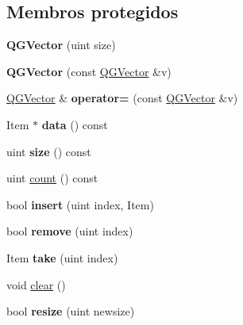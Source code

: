 \subsection*{Membros protegidos}
\begin{DoxyCompactItemize}
\item 
\hypertarget{class_q_g_vector_a9b73290a0df4b98f5170daec8ee3f082}{{\bfseries Q\-G\-Vector} (uint size)}\label{class_q_g_vector_a9b73290a0df4b98f5170daec8ee3f082}

\item 
\hypertarget{class_q_g_vector_af436cba80cc77a48a27d10ba6ebdaebb}{{\bfseries Q\-G\-Vector} (const \hyperlink{class_q_g_vector}{Q\-G\-Vector} \&v)}\label{class_q_g_vector_af436cba80cc77a48a27d10ba6ebdaebb}

\item 
\hypertarget{class_q_g_vector_afec65e370cd15857e4271084e30e86fe}{\hyperlink{class_q_g_vector}{Q\-G\-Vector} \& {\bfseries operator=} (const \hyperlink{class_q_g_vector}{Q\-G\-Vector} \&v)}\label{class_q_g_vector_afec65e370cd15857e4271084e30e86fe}

\item 
\hypertarget{class_q_g_vector_acf79d861a052e4092b516d7914e6c44e}{Item $\ast$ {\bfseries data} () const }\label{class_q_g_vector_acf79d861a052e4092b516d7914e6c44e}

\item 
\hypertarget{class_q_g_vector_a7e63723212bed1ca52f0fe57e58b812e}{uint {\bfseries size} () const }\label{class_q_g_vector_a7e63723212bed1ca52f0fe57e58b812e}

\item 
uint \hyperlink{class_q_g_vector_a774149fc271ebaba2aabcd183a836e8f}{count} () const 
\item 
\hypertarget{class_q_g_vector_af0f0bd8503edb1c51ad9ffbe8cb84f70}{bool {\bfseries insert} (uint index, Item)}\label{class_q_g_vector_af0f0bd8503edb1c51ad9ffbe8cb84f70}

\item 
\hypertarget{class_q_g_vector_a9d32bdeb0fa45bf859e9e7ca13768a60}{bool {\bfseries remove} (uint index)}\label{class_q_g_vector_a9d32bdeb0fa45bf859e9e7ca13768a60}

\item 
\hypertarget{class_q_g_vector_abab7a116bf37110bbcd7d76995aa6dab}{Item {\bfseries take} (uint index)}\label{class_q_g_vector_abab7a116bf37110bbcd7d76995aa6dab}

\item 
void \hyperlink{class_q_g_vector_ac8bb3912a3ce86b15842e79d0b421204}{clear} ()
\item 
\hypertarget{class_q_g_vector_a8f92239def71f172d0c7e40757cffb2d}{bool {\bfseries resize} (uint newsize)}\label{class_q_g_vector_a8f92239def71f172d0c7e40757cffb2d}


\end{DoxyCompactItemize}
